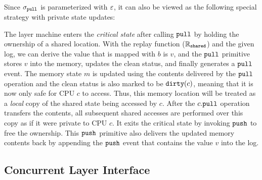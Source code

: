 Since $\sigma_{\mathrm{\texttt{pull}}}$ is parameterized with $\oracle$, it can also be viewed as the following special strategy  with private state updates:%
\begin{center}
\end{center}
The layer machine enters the \emph{critical state} after calling ${\mathrm{\texttt{pull}}}$ by holding the ownership
of a shared location.
With the replay function ($\mathbb{R}_{{\mathrm{\texttt{shared}}}}$) and the given log, 
we can derive the value that is mapped with $b$ is $v$, 
and the ${\mathrm{\texttt{pull}}}$ primitive
stores  $v$  into the memory, updates the clean status,
and finally generates a ${\mathrm{\texttt{pull}}}$ event.
The memory state $m$ is updated using the contents delivered
by the ${\mathrm{\texttt{pull}}}$ operation
and  the clean status is also marked to be ${\mathrm{\texttt{dirty}}}(c)$,
meaning that it is now only safe for CPU $c$ to access.
Thus, this memory location will be treated as
a \emph{local}
copy of the shared state being accessed by $c$.
After the $c.{\mathrm{\texttt{pull}}}$ operation transfers the contents,
all subsequent shared accesses are performed over this 
copy as if it were private to CPU $c$.
It exits the critical state by invoking ${\mathrm{\texttt{push}}}$ to free the ownership.
This ${\mathrm{\texttt{push}}}$ primitive also delivers the updated memory contents back 
by appending the ${\mathrm{\texttt{push}}}$ event that contains the value $v$ into the log.












\subsection{Concurrent Layer Interface}
\label{capther:ccal:sec:concurrent-layer-interface}

